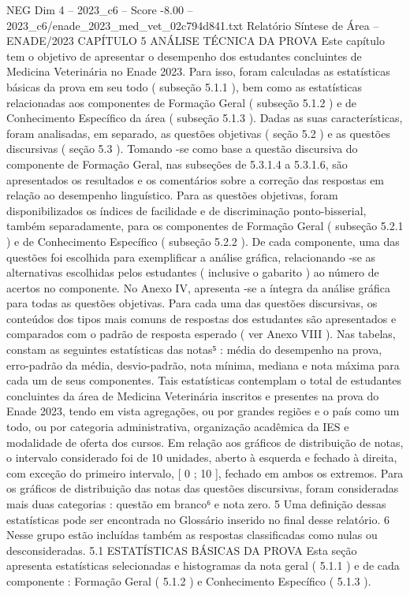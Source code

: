 \begin{textsample}{NEG Dim 4 – 2023\_c6 – Score -8.00 – 2023\_c6/enade\_2023\_med\_vet\_02c794d841.txt}  \label{ex:f4_neg_020}
Relatório Síntese de Área – ENADE/2023 CAPÍTULO 5 ANÁLISE TÉCNICA DA PROVA Este capítulo tem o objetivo de apresentar o desempenho dos estudantes concluintes de Medicina Veterinária no Enade 2023.
Para isso, foram calculadas as estatísticas básicas da prova em seu todo ( subseção 5.1.1 ), bem como as estatísticas relacionadas aos componentes de Formação Geral ( subseção 5.1.2 ) e de Conhecimento Específico da área ( subseção 5.1.3 ).
Dadas as suas características, foram analisadas, em separado, as questões objetivas ( seção 5.2 ) e as questões discursivas ( seção 5.3 ).
Tomando -se como base a questão discursiva do componente de Formação Geral, nas subseções de 5.3.1.4 a 5.3.1.6, são apresentados os resultados e os comentários sobre a correção das respostas em relação ao desempenho linguístico.
Para as questões objetivas, foram disponibilizados os índices de facilidade e de discriminação ponto-bisserial, também separadamente, para os componentes de Formação Geral ( subseção 5.2.1 ) e de Conhecimento Específico ( subseção 5.2.2 ).
De cada componente, uma das questões foi escolhida para exemplificar a análise gráfica, relacionando -se as alternativas escolhidas pelos estudantes ( inclusive o gabarito ) ao número de acertos no componente.
No Anexo IV, apresenta -se a íntegra da análise gráfica para todas as questões objetivas.
Para cada uma das questões discursivas, os conteúdos dos tipos mais comuns de respostas dos estudantes são apresentados e comparados com o padrão de resposta esperado ( ver Anexo VIII ).
Nas tabelas, constam as seguintes estatísticas das notas⁵ : média do desempenho na prova, erro-padrão da média, desvio-padrão, nota mínima, mediana e nota máxima para cada um de seus componentes.
Tais estatísticas contemplam o total de estudantes concluintes da área de Medicina Veterinária inscritos e presentes na prova do Enade 2023, tendo em vista agregações, ou por grandes regiões e o país como um todo, ou por categoria administrativa, organização acadêmica da IES e modalidade de oferta dos cursos.
Em relação aos gráficos de distribuição de notas, o intervalo considerado foi de 10 unidades, aberto à esquerda e fechado à direita, com exceção do primeiro intervalo, [ 0 ; 10 ], fechado em ambos os extremos.
Para os gráficos de distribuição das notas das questões discursivas, foram consideradas mais duas categorias : questão em branco⁶ e nota zero. 5 Uma definição dessas estatísticas pode ser encontrada no Glossário inserido no final desse relatório. 6 Nesse grupo estão incluídas também as respostas classificadas como nulas ou desconsideradas. 5.1 ESTATÍSTICAS BÁSICAS DA PROVA Esta seção apresenta estatísticas selecionadas e histogramas da nota geral ( 5.1.1 ) e de cada componente : Formação Geral ( 5.1.2 ) e Conhecimento Específico ( 5.1.3 ).

\end{textsample}
